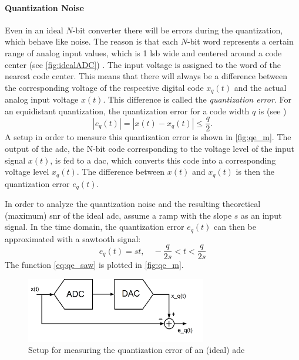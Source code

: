 \paragraph{Quantization Noise}\label{par:quant_noise}
Even in an ideal $N$-bit converter there will be errors during the quantization, which behave like noise.
The reason is that each $N$-bit word represents a certain range of analog input values, which is 1 \gls{lsb} wide and centered around a code center (see \autoref{fig:idealADC}) \cite{Lundberg}.
The input voltage is assigned to the word of the nearest code center.
This means that there will always be a difference between the corresponding voltage of the respective digital code $x_q(t)$ and the actual analog input voltage  $x(t)$.
This difference is called the \textit{quantization error}. For an equidistant quantization, the quantization error for a code width $q$ is (see \cite{puente2015})
\begin{equation}
	\left| e_q(t) \right| = \left| x(t) - x_q(t) \right| \leq \frac{q}{2}.
\end{equation}
A setup in order to measure this quantization error is shown in \autoref{fig:qe_m}. 
The output of the \gls{adc}, the N-bit code corresponding to the voltage level of the input signal $x(t)$, is fed to a \gls{dac}, which converts this code into a corresponding voltage level $x_q(t)$. 
The difference between $x(t)$ and $x_q(t)$ is then the quantization error $e_q(t)$.

In order to analyze the quantization noise and the resulting theoretical (maximum) \gls{snr} of the ideal \gls{adc}, assume a ramp with the slope $s$ as an input signal. In the time domain, the quantization error $e_q(t)$ can then be approximated with a sawtooth signal: 
\begin{equation}\label{eq:qe_saw}
	e_q(t) = st, \quad -\frac{q}{2s} < t < \frac{q}{2s} 
\end{equation}
The function \autoref{eq:qe_saw} is plotted in \autoref{fig:qe_m}.
\begin{figure}[tbh]
	\centering
	\includegraphics[width = 0.7\textwidth]{chap/02-theory/img/qe_m}
	\caption[Measurement setup for quantization error]{Setup for measuring the quantization error of an (ideal) \gls{adc}}
	\label{fig:qe_m}
\end{figure}

